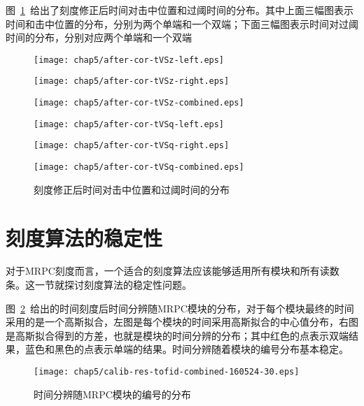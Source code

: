 图~\ref{fig:after-Calibration}~给出了刻度修正后时间对击中位置和过阈时间的分布。其中上面三幅图表示时间和击中位置的分布，分别为两个单端和一个双端；下面三幅图表示时间对过阈时间的分布，分别对应两个单端和一个双端
\begin{figure}[htbp]
\begin{minipage}[t]{0.33\linewidth}
\texttt{[image: chap5/after-cor-tVSz-left.eps]}
\label{fig:after-cor-tVSz-left}
\end{minipage}%
\hfill
\begin{minipage}[t]{0.33\linewidth}
\texttt{[image: chap5/after-cor-tVSz-right.eps]}
\label{fig:after-cor-tVSz-right}
\end{minipage}
\hfill
\begin{minipage}[t]{0.33\linewidth}
\texttt{[image: chap5/after-cor-tVSz-combined.eps]}
\label{fig:after-cor-tVSz-combined}
\end{minipage}
\vfill
\begin{minipage}[t]{0.33\linewidth}
\texttt{[image: chap5/after-cor-tVSq-left.eps]}
\label{fig:after-cor-tVSq-left}
\end{minipage}%
\hfill
\begin{minipage}[t]{0.33\linewidth}
\texttt{[image: chap5/after-cor-tVSq-right.eps]}
\label{fig:after-cor-tVSq-right}
\end{minipage}
\hfill
\begin{minipage}[t]{0.33\linewidth}
\texttt{[image: chap5/after-cor-tVSq-combined.eps]}
\label{fig:after-cor-tVSq-combined}
\end{minipage}
\caption{刻度修正后时间对击中位置和过阈时间的分布}
\label{fig:after-Calibration}
\end{figure}

\section{刻度算法的稳定性}
对于MRPC刻度而言，一个适合的刻度算法应该能够适用所有模块和所有读数条。这一节就探讨刻度算法的稳定性问题。

图~\ref{fig:calib-res-tofid-combined-160524-30}~给出的时间刻度后时间分辨随MRPC模块的分布，对于每个模块最终的时间采用的是一个高斯拟合，左图是每个模块的时间采用高斯拟合的中心值分布，右图是高斯拟合得到的方差，也就是模块的时间分辨的分布；其中红色的点表示双端结果，蓝色和黑色的点表示单端的结果。时间分辨随着模块的编号分布基本稳定。
\begin{figure}[!h]
\centering
\texttt{[image: chap5/calib-res-tofid-combined-160524-30.eps]}
\caption{时间分辨随MRPC模块的编号的分布}
\label{fig:calib-res-tofid-combined-160524-30}
\end{figure}


